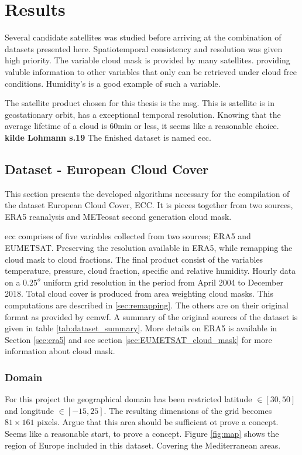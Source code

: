 \chapter{Results}
Several candidate satellites was studied before arriving at the combination of datasets presented here. Spatiotemporal consistency and resolution was given high priority.%
The variable cloud mask is provided by many satellites. providing valuble information to other variables that only can be retrieved under cloud free conditions. Humidity's is a good example of such a variable. 

The satellite product chosen for this thesis is the \acrfull{msg}. This is satellite is in geostationary orbit, has a exceptional temporal resolution. Knowing that the average lifetime of a cloud is 60min or less, it seems like a reasonable choice. \textbf{kilde Lohmann s.19} The finished dataset is named \acrfull{ecc}.

\section{Dataset - European Cloud Cover }
This section presents the developed algorithms necessary for the compilation of the dataset European Cloud Cover, ECC. It is pieces together from two sources, ERA5 reanalysis and METeosat second generation cloud mask. %

\acrfull{ecc} comprises of five variables collected from two sources; ERA5 and EUMETSAT. Preserving the resolution available in ERA5, while remapping the cloud mask to cloud fractions. The final product consist of the variables temperature, pressure, cloud fraction, specific and relative humidity. Hourly data on a $0.25^o$ uniform grid resolution in the period from April 2004 to December 2018. Total cloud cover is produced from area weighting cloud masks. This computations are described in \ref{sec:remapping}. The others are on their original format as provided by \acrfull{ecmwf}. A summary of the original sources of the dataset is given in table \ref{tab:dataset_summary}. More details on ERA5 is available in Section \ref{sec:era5} and see section \ref{sec:EUMETSAT_cloud_mask} for more information about cloud mask. 


\subsection{Domain}
For this project the geographical domain has been restricted latitude $\in[30,50]$ and longitude $\in [-15, 25]$. The resulting dimensions of the grid becomes $81\times161$ pixels. Argue that this area should be sufficient ot prove a concept. Seems like a reasonable start, to prove a concept. Figure \ref{fig:map} shows the region of Europe included in this dataset. Covering the Mediterranean areas.

